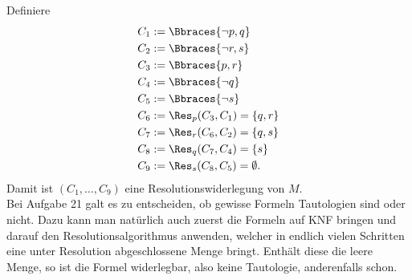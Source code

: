 \begin{solution}

Definiere
\begin{align*}
    C_1 &:= \Bbraces{\neg p, q} \\
    C_2 &:= \Bbraces{\neg r, s} \\
    C_3 &:= \Bbraces{p, r} \\
    C_4 &:= \Bbraces{\neg q} \\
    C_5 &:= \Bbraces{\neg s} \\
    C_6 &:= \Res_p(C_3,C_1) = \{q, r\} \\
    C_7 &:= \Res_r(C_6,C_2) = \{q, s\} \\
    C_8 &:= \Res_q(C_7,C_4) = \{s\} \\
    C_9 &:= \Res_s(C_8,C_5) = \emptyset.
\end{align*}
Damit ist $(C_1,\dots,C_9)$ eine Resolutionswiderlegung von $M$. \\
Bei Aufgabe 21 galt es zu entscheiden, ob gewisse Formeln Tautologien sind oder nicht.
Dazu kann man natürlich auch zuerst die Formeln auf KNF bringen und darauf den
Resolutionsalgorithmus anwenden, welcher in endlich vielen Schritten eine
unter Resolution abgeschlossene Menge bringt. Enthält diese die leere Menge,
so ist die Formel widerlegbar, also keine Tautologie, anderenfalls schon.

\end{solution}

